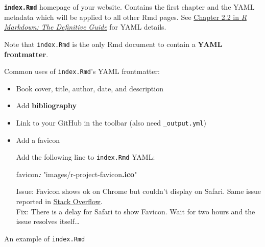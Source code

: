 \documentclass[
  a4paper,
  twoside,
  openright]{book}
\newenvironment{Shaded}{\begin{snugshade}}{\end{snugshade}}
\newcommand{\FunctionTok}[1]{\textcolor[rgb]{0.13,0.29,0.53}{\textbf{#1}}}
\newcommand{\InformationTok}[1]{\textcolor[rgb]{0.56,0.35,0.01}{\textbf{\textit{#1}}}}
\newcommand{\NormalTok}[1]{#1}
\theoremstyle{definition}
\theoremstyle{definition}
\theoremstyle{definition}
\theoremstyle{definition}
\theoremstyle{remark}
\begin{document}
\textbf{\texttt{index.Rmd}} {homepage of your website}. Contains the first chapter and the YAML metadata which will be applied to all other Rmd pages. See \href{https://bookdown.org/yihui/rmarkdown/compile.html}{Chapter 2.2 in \emph{R Markdown: The Definitive Guide}} for YAML details.

Note that \texttt{index.Rmd} is the only Rmd document to contain a \textbf{YAML frontmatter}.

Common uses of \texttt{index.Rmd}'s YAML frontmatter:

\begin{itemize}
\item
  Book cover, title, author, date, and description
\item
  Add \textbf{bibliography}
\item
  Link to your GitHub in the toolbar (also need \texttt{\_output.yml})
\item
  Add a favicon

  Add the following line to \texttt{index.Rmd} YAML:

\begin{Shaded}
\begin{Highlighting}[]
\NormalTok{favicon}\InformationTok{:}\NormalTok{ "images/r{-}project{-}favicon}\FunctionTok{.ico}\NormalTok{"}
\end{Highlighting}
\end{Shaded}

  Issue: Favicon shows ok on Chrome but couldn't display on Safari. Same issue reported in \href{https://stackoverflow.com/questions/66023588/r-bookdown-favicon-works-offline-but-not-online}{Stack Overflow}.\\
  Fix: There is a delay for Safari to show Favicon. Wait for two hours and the issue resolves itself\ldots{}
\end{itemize}

An example of \texttt{index.Rmd}
\end{document}
